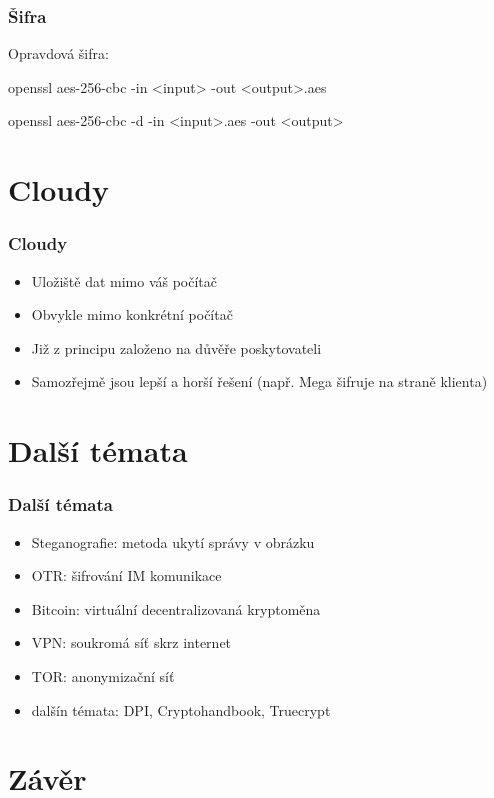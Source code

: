 \documentclass[xetex]{beamer}
\begin{document}
\begin{frame}
 \frametitle{Šifra}
 Opravdová šifra:

 \bigskip

 openssl aes-256-cbc -in <input> -out <output>.aes

 \bigskip

 openssl aes-256-cbc -d -in <input>.aes -out <output>
\end{frame}

\section{Cloudy}

\begin{frame}
 \frametitle{Cloudy} 
\begin{itemize} 
   \item Uložiště dat mimo váš počítač
   \item Obvykle mimo konkrétní počítač
   \item Již z principu založeno na důvěře poskytovateli
   \item Samozřejmě jsou lepší a horší řešení (např. Mega šifruje na straně klienta)
 \end{itemize} 
\end{frame}

\section{Další témata}
\begin{frame}
 \frametitle{Další témata}
 \begin{itemize}
  \item Steganografie: metoda ukytí správy v obrázku
  \item OTR: šifrování IM komunikace
  \item Bitcoin: virtuální decentralizovaná kryptoměna
  \item VPN: soukromá síť skrz internet
  \item TOR: anonymizační síť
  \item dalšín témata: DPI, Cryptohandbook, Truecrypt
 \end{itemize}
\end{frame}

\section{Závěr}
\end{document}
